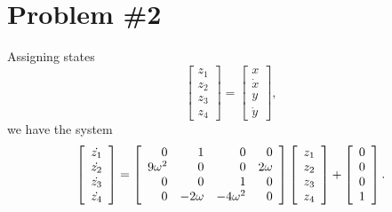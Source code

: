 \documentclass{article}
\begin{document}
\section*{Problem \#2}
Assigning states
$$
\left[\begin{array}{c}
  z_1 \\
  z_2 \\
  z_3 \\
  z_4
\end{array}\right]
=
\left[\begin{array}{c}
        x \\
  \dot{x} \\
        y \\
  \dot{y}
\end{array}\right],
$$
we have the system
$$
\left[\begin{array}{c}
  \dot{z_1} \\
  \dot{z_2} \\
  \dot{z_3} \\
  \dot{z_4}
\end{array}\right]
=
\left[\begin{array}{r r r r}
           0 &        1 &          0 &       0 \\
  9 \omega^2 &        0 &          0 & 2 \omega \\
           0 &        0 &          1 &       0  \\
           0 & -2\omega & -4\omega^2 &       0
\end{array}\right]
\left[\begin{array}{c}
  z_1 \\
  z_2 \\
  z_3 \\
  z_4
\end{array}\right]
+
\left[\begin{array}{r}
  0 \\
  0 \\
  0 \\
  1
\end{array}\right].
$$
\end{document}
